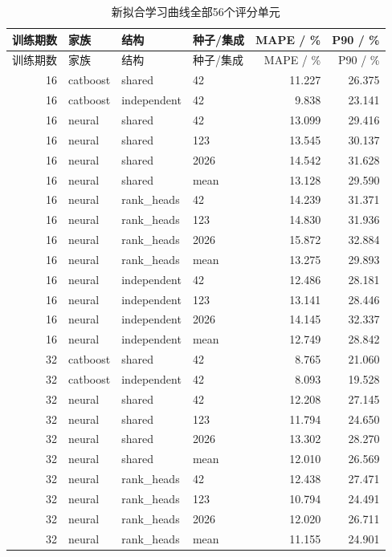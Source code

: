 \begingroup\footnotesize\setlength{\tabcolsep}{3pt}
\begin{longtable}{r l l l r r}
\caption{新拟合学习曲线全部56个评分单元}\label{tab:learningseeds}\\
\toprule
训练期数 & 家族 & 结构 & 种子/集成 & MAPE / \% & P90 / \% \\
\midrule\endfirsthead
\toprule
训练期数 & 家族 & 结构 & 种子/集成 & MAPE / \% & P90 / \% \\
\midrule\endhead
16 & catboost & shared & 42 & 11.227 & 26.375 \\
16 & catboost & independent & 42 & 9.838 & 23.141 \\
16 & neural & shared & 42 & 13.099 & 29.416 \\
16 & neural & shared & 123 & 13.545 & 30.137 \\
16 & neural & shared & 2026 & 14.542 & 31.628 \\
16 & neural & shared & mean & 13.128 & 29.590 \\
16 & neural & rank\_heads & 42 & 14.239 & 31.371 \\
16 & neural & rank\_heads & 123 & 14.830 & 31.936 \\
16 & neural & rank\_heads & 2026 & 15.872 & 32.884 \\
16 & neural & rank\_heads & mean & 13.275 & 29.893 \\
16 & neural & independent & 42 & 12.486 & 28.181 \\
16 & neural & independent & 123 & 13.141 & 28.446 \\
16 & neural & independent & 2026 & 14.145 & 32.337 \\
16 & neural & independent & mean & 12.749 & 28.842 \\
32 & catboost & shared & 42 & 8.765 & 21.060 \\
32 & catboost & independent & 42 & 8.093 & 19.528 \\
32 & neural & shared & 42 & 12.208 & 27.145 \\
32 & neural & shared & 123 & 11.794 & 24.650 \\
32 & neural & shared & 2026 & 13.302 & 28.270 \\
32 & neural & shared & mean & 12.010 & 26.569 \\
32 & neural & rank\_heads & 42 & 12.438 & 27.471 \\
32 & neural & rank\_heads & 123 & 10.794 & 24.491 \\
32 & neural & rank\_heads & 2026 & 12.020 & 26.711 \\
32 & neural & rank\_heads & mean & 11.155 & 24.901 \\

\end{longtable}
